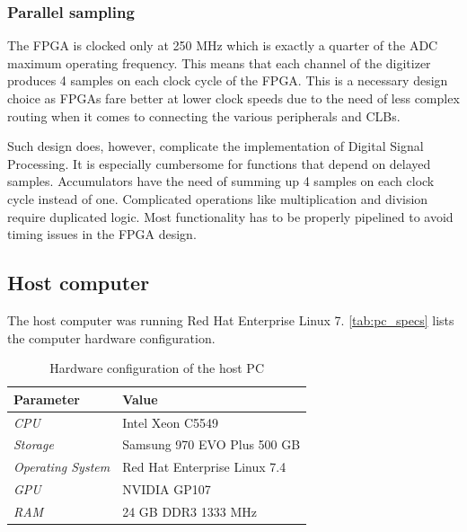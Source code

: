 \subsubsection{Parallel sampling} \label{sssec:parallel_sampling}

The FPGA is clocked only at 250 MHz which is exactly a quarter of 
the ADC maximum operating frequency. This means that each channel
of the digitizer produces 4 samples on each clock cycle of the 
FPGA. This is a necessary design choice as FPGAs fare better 
at lower clock speeds due to the need of less complex routing
when it comes to connecting the various peripherals and CLBs.


Such design does, however, complicate the implementation of 
Digital Signal Processing. It is especially cumbersome for 
functions that depend on delayed samples.
Accumulators have the need of summing up 4 samples on
each clock cycle instead of one. Complicated operations
like multiplication and division require duplicated logic.
Most functionality has to be properly pipelined to avoid
timing issues in the FPGA design.

\subsection{Host computer}

The host computer was running Red Hat Enterprise Linux 7.
\autoref{tab:pc_specs} lists the computer hardware configuration.
\begin{table}[H]
\caption{Hardware configuration of the host PC}
\centering
  \begin{tabular}{l | l}
  {\bfseries Parameter} & {\bfseries Value}\\
  \hline
  \textit {CPU}             & Intel Xeon C5549 \\ \hline
  \textit {Storage}  & Samsung 970 EVO Plus 500 GB \\ \hline
  \textit {Operating System}   & Red Hat Enterprise Linux 7.4\\ \hline
  \textit {GPU}         & NVIDIA GP107 \\ \hline
  \textit {RAM}      & 24 GB DDR3 1333 MHz\\ 
  \end{tabular}
  \label{tab:pc_specs}
\end{table}


